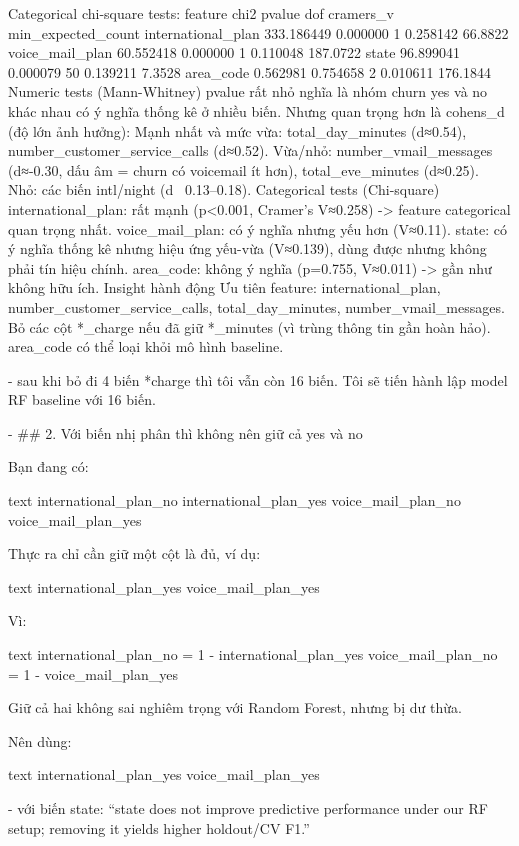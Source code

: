 Categorical chi-square tests:
           feature       chi2   pvalue  dof  cramers_v  min_expected_count
international_plan 333.186449 0.000000    1   0.258142             66.8822
   voice_mail_plan  60.552418 0.000000    1   0.110048            187.0722
             state  96.899041 0.000079   50   0.139211              7.3528
         area_code   0.562981 0.754658    2   0.010611            176.1844
Numeric tests (Mann-Whitney)
pvalue rất nhỏ nghĩa là nhóm churn yes và no khác nhau có ý nghĩa thống kê ở nhiều biến.
Nhưng quan trọng hơn là cohens_d (độ lớn ảnh hưởng):
Mạnh nhất và mức vừa: total_day_minutes (d≈0.54), number_customer_service_calls (d≈0.52).
Vừa/nhỏ: number_vmail_messages (d≈-0.30, dấu âm = churn có voicemail ít hơn), total_eve_minutes (d≈0.25).
Nhỏ: các biến intl/night (d ~0.13–0.18).
Categorical tests (Chi-square)
international_plan: rất mạnh (p<0.001, Cramer's V≈0.258) -> feature categorical quan trọng nhất.
voice_mail_plan: có ý nghĩa nhưng yếu hơn (V≈0.11).
state: có ý nghĩa thống kê nhưng hiệu ứng yếu-vừa (V≈0.139), dùng được nhưng không phải tín hiệu chính.
area_code: không ý nghĩa (p=0.755, V≈0.011) -> gần như không hữu ích.
Insight hành động
Ưu tiên feature: international_plan, number_customer_service_calls, total_day_minutes, number_vmail_messages.
Bỏ các cột *_charge nếu đã giữ *_minutes (vì trùng thông tin gần hoàn hảo).
area_code có thể loại khỏi mô hình baseline.

- sau khi bỏ đi 4 biến *charge thì tôi vẫn còn 16 biến. Tôi sẽ tiến hành lập model RF baseline với 16 biến.

- ## 2. Với biến nhị phân thì không nên giữ cả yes và no

Bạn đang có:

text
international_plan_no
international_plan_yes
voice_mail_plan_no
voice_mail_plan_yes


Thực ra chỉ cần giữ một cột là đủ, ví dụ:

text
international_plan_yes
voice_mail_plan_yes


Vì:

text
international_plan_no = 1 - international_plan_yes
voice_mail_plan_no = 1 - voice_mail_plan_yes


Giữ cả hai không sai nghiêm trọng với Random Forest, nhưng bị dư thừa.

Nên dùng:

text
international_plan_yes
voice_mail_plan_yes


- với biến state: 
“state does not improve predictive performance under our RF setup; removing it yields higher holdout/CV F1.”

